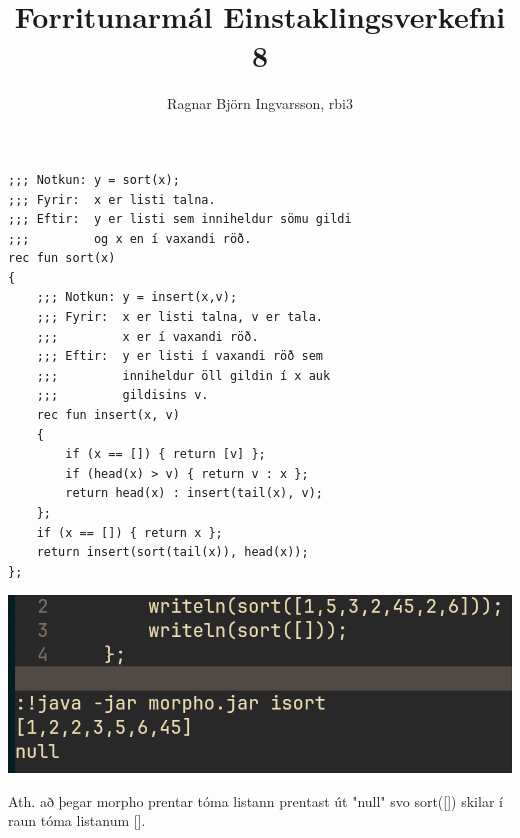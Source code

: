 \documentclass{article}
\title{Forritunarmál Einstaklingsverkefni 8}
\author{Ragnar Björn Ingvarsson, rbi3}
\begin{document}
\renewcommand\thepage{}
	
	\maketitle

	\newpage
	\setcounter{page}{1}
	\renewcommand\thepage{\arabic{page}}

	\section{}
	\begin{verbatim}
;;; Notkun: y = sort(x);
;;; Fyrir:  x er listi talna.
;;; Eftir:  y er listi sem inniheldur sömu gildi
;;;         og x en í vaxandi röð.
rec fun sort(x)
{
    ;;; Notkun: y = insert(x,v);
    ;;; Fyrir:  x er listi talna, v er tala.
    ;;;         x er í vaxandi röð.
    ;;; Eftir:  y er listi í vaxandi röð sem
    ;;;         inniheldur öll gildin í x auk 
    ;;;         gildisins v.
    rec fun insert(x, v)
    {
        if (x == []) { return [v] };
        if (head(x) > v) { return v : x };
        return head(x) : insert(tail(x), v);
    };
    if (x == []) { return x };
    return insert(sort(tail(x)), head(x));
};
	\end{verbatim}
	\begin{center}
		\includegraphics[scale=0.35]{isort.png}
	\end{center}
	Ath. að þegar morpho prentar tóma listann prentast út "null"\hspace{0.1em} svo 
	sort([]) skilar í raun tóma listanum [].
\end{document}
